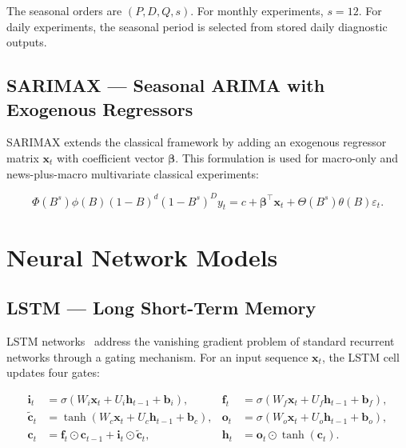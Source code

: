 \documentclass[12pt,a4paper]{article}
\begin{document}
The seasonal orders are $(P, D, Q, s)$. For monthly experiments, $s = 12$. For daily experiments, the seasonal period is selected from stored daily diagnostic outputs.

\subsection{SARIMAX — Seasonal ARIMA with Exogenous Regressors}

SARIMAX extends the classical framework by adding an exogenous regressor matrix $\mathbf{x}_t$ with coefficient vector $\boldsymbol{\beta}$. This formulation is used for macro-only and news-plus-macro multivariate classical experiments:

\begin{equation}
\Phi(B^s)\phi(B)(1-B)^d(1-B^s)^D y_t
= c + \boldsymbol{\beta}^{\top}\mathbf{x}_t + \Theta(B^s)\theta(B)\varepsilon_t.
\label{eq:sarimax}
\end{equation}

\section{Neural Network Models}\label{sec:neural}

\subsection{LSTM — Long Short-Term Memory}

LSTM networks~\citep{hochreiter1997long,gers2000learning} address the vanishing gradient problem of standard recurrent networks through a gating mechanism. For an input sequence $\mathbf{x}_t$, the LSTM cell updates four gates:

\begin{align}
\mathbf{i}_t &= \sigma(W_i\mathbf{x}_t + U_i\mathbf{h}_{t-1} + \mathbf{b}_i), &
\mathbf{f}_t &= \sigma(W_f\mathbf{x}_t + U_f\mathbf{h}_{t-1} + \mathbf{b}_f), \nonumber\\
\tilde{\mathbf{c}}_t &= \tanh(W_c\mathbf{x}_t + U_c\mathbf{h}_{t-1} + \mathbf{b}_c), &
\mathbf{o}_t &= \sigma(W_o\mathbf{x}_t + U_o\mathbf{h}_{t-1} + \mathbf{b}_o), \label{eq:lstm-gates}\\
\mathbf{c}_t &= \mathbf{f}_t \odot \mathbf{c}_{t-1} + \mathbf{i}_t \odot \tilde{\mathbf{c}}_t, &
\mathbf{h}_t &= \mathbf{o}_t \odot \tanh(\mathbf{c}_t). \nonumber
\end{align}
\end{document}
